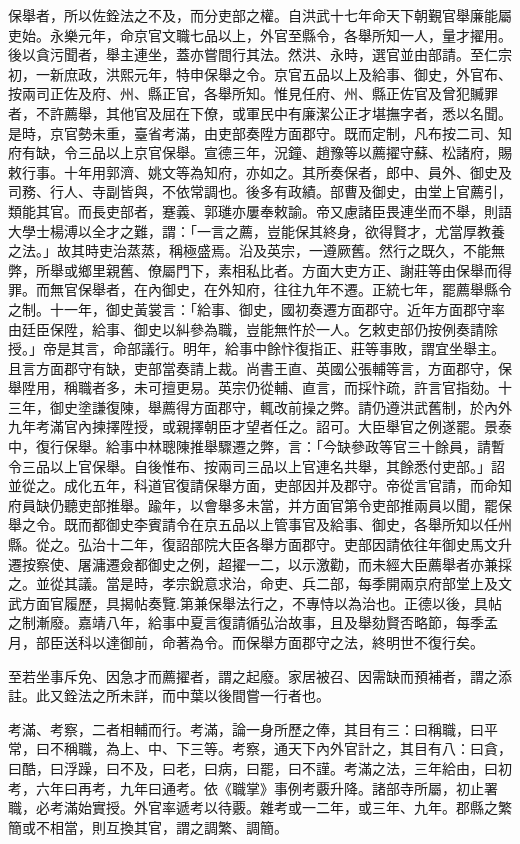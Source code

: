 保舉者，所以佐銓法之不及，而分吏部之權。自洪武十七年命天下朝覲官舉廉能屬吏始。永樂元年，命京官文職七品以上，外官至縣令，各舉所知一人，量才擢用。後以貪污聞者，舉主連坐，蓋亦嘗間行其法。然洪、永時，選官並由部請。至仁宗初，一新庶政，洪熙元年，特申保舉之令。京官五品以上及給事、御史，外官布、按兩司正佐及府、州、縣正官，各舉所知。惟見任府、州、縣正佐官及曾犯贓罪者，不許薦舉，其他官及屈在下僚，或軍民中有廉潔公正才堪撫字者，悉以名聞。是時，京官勢未重，臺省考滿，由吏部奏陞方面郡守。既而定制，凡布按二司、知府有缺，令三品以上京官保舉。宣德三年，況鐘、趙豫等以薦擢守蘇、松諸府，賜敕行事。十年用郭濟、姚文等為知府，亦如之。其所奏保者，郎中、員外、御史及司務、行人、寺副皆與，不依常調也。後多有政績。部曹及御史，由堂上官薦引，類能其官。而長吏部者，蹇義、郭璡亦屢奉敕諭。帝又慮諸臣畏連坐而不舉，則語大學士楊溥以全才之難，謂：「一言之薦，豈能保其終身，欲得賢才，尤當厚教養之法。」故其時吏治蒸蒸，稱極盛焉。沿及英宗，一遵厥舊。然行之既久，不能無弊，所舉或鄉里親舊、僚屬門下，素相私比者。方面大吏方正、謝莊等由保舉而得罪。而無官保舉者，在內御史，在外知府，往往九年不遷。正統七年，罷薦舉縣令之制。十一年，御史黃裳言：「給事、御史，國初奏遷方面郡守。近年方面郡守率由廷臣保陞，給事、御史以糾參為職，豈能無忤於一人。乞敕吏部仍按例奏請除授。」帝是其言，命部議行。明年，給事中餘忭復指正、莊等事敗，謂宜坐舉主。且言方面郡守有缺，吏部當奏請上裁。尚書王直、英國公張輔等言，方面郡守，保舉陞用，稱職者多，未可擅更易。英宗仍從輔、直言，而採忭疏，許言官指劾。十三年，御史塗謙復陳，舉薦得方面郡守，輒改前操之弊。請仍遵洪武舊制，於內外九年考滿官內揀擇陞授，或親擇朝臣才望者任之。詔可。大臣舉官之例遂罷。景泰中，復行保舉。給事中林聰陳推舉驟遷之弊，言：「今缺參政等官三十餘員，請暫令三品以上官保舉。自後惟布、按兩司三品以上官連名共舉，其餘悉付吏部。」詔並從之。成化五年，科道官復請保舉方面，吏部因并及郡守。帝從言官請，而命知府員缺仍聽吏部推舉。踰年，以會舉多未當，并方面官第令吏部推兩員以聞，罷保舉之令。既而都御史李賓請令在京五品以上管事官及給事、御史，各舉所知以任州縣。從之。弘治十二年，復詔部院大臣各舉方面郡守。吏部因請依往年御史馬文升遷按察使、屠滽遷僉都御史之例，超擢一二，以示激勸，而未經大臣薦舉者亦兼採之。並從其議。當是時，孝宗銳意求治，命吏、兵二部，每季開兩京府部堂上及文武方面官履歷，具揭帖奏覽.第兼保舉法行之，不專恃以為治也。正德以後，具帖之制漸廢。嘉靖八年，給事中夏言復請循弘治故事，且及舉劾賢否略節，每季孟月，部臣送科以達御前，命著為令。而保舉方面郡守之法，終明世不復行矣。

至若坐事斥免、因急才而薦擢者，謂之起廢。家居被召、因需缺而預補者，謂之添註。此又銓法之所未詳，而中葉以後間嘗一行者也。

考滿、考察，二者相輔而行。考滿，論一身所歷之俸，其目有三：曰稱職，曰平常，曰不稱職，為上、中、下三等。考察，通天下內外官計之，其目有八：曰貪，曰酷，曰浮躁，曰不及，曰老，曰病，曰罷，曰不謹。考滿之法，三年給由，曰初考，六年曰再考，九年曰通考。依《職掌》事例考覈升降。諸部寺所屬，初止署職，必考滿始實授。外官率遞考以待覈。雜考或一二年，或三年、九年。郡縣之繁簡或不相當，則互換其官，謂之調繁、調簡。

